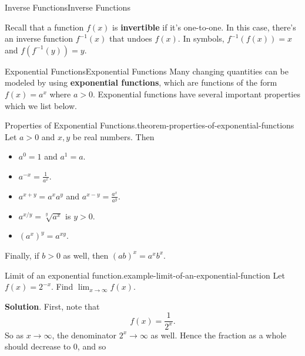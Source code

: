 \documentclass[10pt,]{book}
\newcommand{\terminology}[1]{\textbf{#1}}
\numberwithin{equation}{section}
\begin{document}
\begin{chapterptx}{Inverse Functions}{}{Inverse Functions}{}{}\label{inverse-functions}
\begin{introduction}{}%
\hypertarget{p-185}{}%
Recall that a function \(f(x)\) is \terminology{invertible} if it's one-to-one. In this case, there's an inverse function \(f^{-1}(x)\) that undoes \(f(x)\). In symbols, \(f^{-1}(f(x)) = x\) and \(f(f^{-1}(y)) = y\).%
\end{introduction}%
%
%
\typeout{************************************************}
\typeout{************************************************}
%
\begin{sectionptx}{Exponential Functions}{}{Exponential Functions}{}{}\label{section-exponential-functions}
\hypertarget{p-186}{}%
Many changing quantities can be modeled by using \terminology{exponential functions}, which are functions of the form \(f(x) = a^{x}\) where \(a > 0\). Exponential functions have several important properties which we list below.%
\begin{theorem}{Properties of Exponential Functions.}{}{theorem-properties-of-exponential-functions}%
\hypertarget{p-187}{}%
Let \(a > 0\) and \(x,y\) be real numbers. Then \leavevmode%
\begin{itemize}[label=\textbullet]
\item{}\(a^{0} = 1\) and \(a^{1} = a\).%
\item{}\(a^{-x} = \frac{1}{a^{x}}\).%
\item{}\(a^{x+y} = a^{x}a^{y}\) and \(a^{x-y} = \frac{a^{x}}{a^{y}}\).%
\item{}\(a^{x/y} = \sqrt[y]{a^{x}}\) is \(y > 0\).%
\item{}\((a^{x})^{y} = a^{xy}\).%
\end{itemize}
 Finally, if \(b > 0\) as well, then \((ab)^{x} = a^{x}b^{x}\).%
\end{theorem}
\begin{example}{Limit of an exponential function.}{example-limit-of-an-exponential-function}%
\hypertarget{p-188}{}%
Let \(f(x) = 2^{-x}\). Find \(\lim_{x\to\infty}f(x)\).%
\par\smallskip%
\noindent\textbf{Solution}.\hypertarget{solution-42}{}\quad%
\hypertarget{p-189}{}%
First, note that%
\begin{equation*}
f(x) = \frac{1}{2^{x}}.
\end{equation*}
So as \(x\to\infty\), the denominator \(2^{x}\to\infty\) as well. Hence the fraction as a whole should decrease to \(0\), and so%

\end{example}
\end{sectionptx}
\end{chapterptx}
\end{document}
